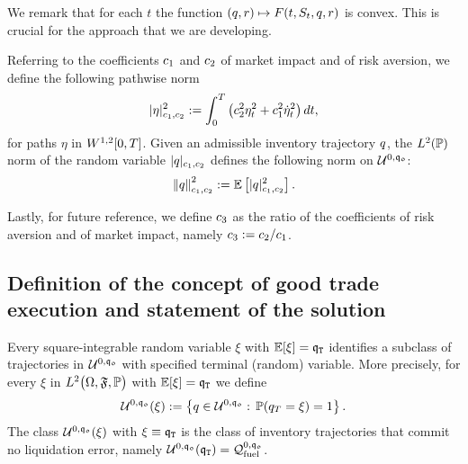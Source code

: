 \documentclass[10pt,a4paper]{article}
\begin{document}
We remark that for each $t$ the function $(\inventory,r)\mapsto F(t,\fundamentalPrice_t, \inventory,r)$ is convex. This is crucial for the approach that we are developing. 

Referring to the coefficients $\coeffMarketImpact$ and $\coeffRiskAversion$ of market impact and of risk aversion, we define the following pathwise norm
\begin{equation}\label{eq.pathwiseSobolevNormIC}
\lvert \eta \rvert_{\coeffMarketImpact,\coeffRiskAversion}\squared := \intZeroTimeHorizon \left( \coeffRiskAversion\squared \eta_t \squared + \coeffMarketImpact\squared \dotEta_t\squared \right)dt,
\end{equation}
for paths $\eta$ in $\sobolevSpaceOneTwo\timeWindow$. Given an admissible inventory trajectory $\inventory$, the $\Ltwo(\Prob)$ norm of the random variable $\lvert \inventory \rvert_{\coeffMarketImpact,\coeffRiskAversion}$ defines the following norm on $\spaceUnbiasedInventoryTrajectoriesInitialConstraint$: 
\begin{equation}\label{eq.sobolevNormOfInventoryTrajectoryIC}
\norm[\inventory]_{\coeffMarketImpact,\coeffRiskAversion}\squared: = \Expectation\left[\lvert \inventory \rvert_{\coeffMarketImpact,\coeffRiskAversion}\squared \right].
\end{equation}

Lastly, for future reference, we define $\ratioAversionOverImpact$ as the ratio of the coefficients of risk aversion and of market impact, namely $\ratioAversionOverImpact := \coeffRiskAversion/\coeffMarketImpact$. 

\subsection{Definition of the concept of good trade execution and statement of the solution}\label{sec.statementOfGoodTradeExecutionIC}


Every square-integrable random variable $\xi$ with $\Expectation[\xi] = \liquidationTarget$ identifies a subclass of trajectories in $\spaceUnbiasedInventoryTrajectoriesInitialConstraint$ with specified terminal (random) variable. More precisely, for every $\xi$ in $L^2\probabilitySpace$ with  $\Expectation[\xi] = \liquidationTarget$  we define 
\begin{equation*}
\spaceUnbiasedInventoryTrajectoriesInitialConstraint(\xi) := \left\lbrace
\inventory \in \spaceUnbiasedInventoryTrajectoriesInitialConstraint : \, \Prob(\inventory_\timeHorizon=\xi)=1 
\right\rbrace.
\end{equation*}
The class $\spaceUnbiasedInventoryTrajectoriesInitialConstraint(\xi)$ with $\xi \equiv \liquidationTarget$ is the class of inventory trajectories that commit no liquidation error, namely $\spaceUnbiasedInventoryTrajectoriesInitialConstraint(\liquidationTarget) = \spaceInventoryTrajectoriesFuel^{0,\initialInventory}$. 
\end{document}
